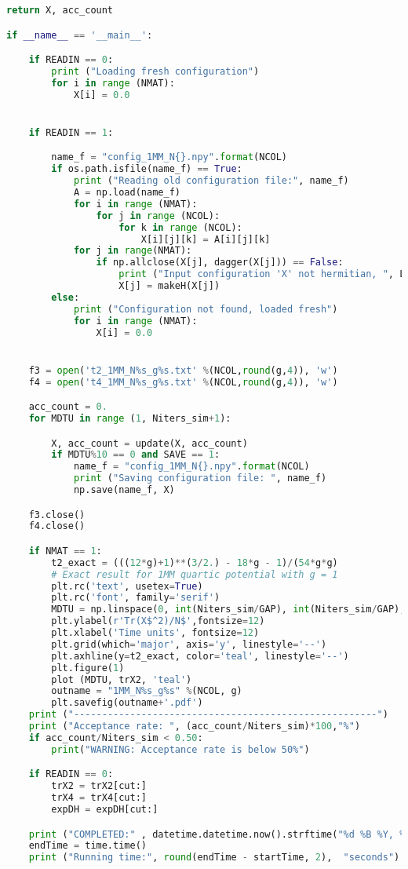\begin{lstlisting}[language=Python]
	return X, acc_count

if __name__ == '__main__':

	if READIN == 0:
		print ("Loading fresh configuration")
		for i in range (NMAT): 
			X[i] = 0.0  


	if READIN == 1:

		name_f = "config_1MM_N{}.npy".format(NCOL)
		if os.path.isfile(name_f) == True: 
			print ("Reading old configuration file:", name_f)
			A = np.load(name_f)
			for i in range (NMAT):
				for j in range (NCOL):
					for k in range (NCOL):
						X[i][j][k] = A[i][j][k]
			for j in range(NMAT):
				if np.allclose(X[j], dagger(X[j])) == False:
					print ("Input configuration 'X' not hermitian, ", LA.norm(X[j] - dagger(X[j])), "making it so")
					X[j] = makeH(X[j])
		else:
			print ("Configuration not found, loaded fresh")
			for i in range (NMAT): 
				X[i] = 0.0


	f3 = open('t2_1MM_N%s_g%s.txt' %(NCOL,round(g,4)), 'w')
	f4 = open('t4_1MM_N%s_g%s.txt' %(NCOL,round(g,4)), 'w')

	acc_count = 0.
	for MDTU in range (1, Niters_sim+1):

		X, acc_count = update(X, acc_count)
		if MDTU%10 == 0 and SAVE == 1:
			name_f = "config_1MM_N{}.npy".format(NCOL)
			print ("Saving configuration file: ", name_f)
			np.save(name_f, X)

	f3.close()
	f4.close()

	if NMAT == 1:  
		t2_exact = (((12*g)+1)**(3/2.) - 18*g - 1)/(54*g*g)
		# Exact result for 1MM quartic potential with g = 1
		plt.rc('text', usetex=True)
		plt.rc('font', family='serif')
		MDTU = np.linspace(0, int(Niters_sim/GAP), int(Niters_sim/GAP), endpoint=True)
		plt.ylabel(r'Tr(X$^2)/N$',fontsize=12)
		plt.xlabel('Time units', fontsize=12)
		plt.grid(which='major', axis='y', linestyle='--')
		plt.axhline(y=t2_exact, color='teal', linestyle='--')
		plt.figure(1)
		plot (MDTU, trX2, 'teal') 
		outname = "1MM_N%s_g%s" %(NCOL, g)
		plt.savefig(outname+'.pdf')
	print ("------------------------------------------------------")
	print ("Acceptance rate: ", (acc_count/Niters_sim)*100,"%") 
	if acc_count/Niters_sim < 0.50:
		print("WARNING: Acceptance rate is below 50%")

	if READIN == 0:
		trX2 = trX2[cut:]
		trX4 = trX4[cut:]
		expDH = expDH[cut:] 

	print ("COMPLETED:" , datetime.datetime.now().strftime("%d %B %Y, %H:%M:%S"))
	endTime = time.time() 
	print ("Running time:", round(endTime - startTime, 2),  "seconds")
\end{lstlisting}